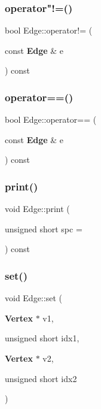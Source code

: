 \mbox{\label{classEdge_aad68f2cc1043548996c7ce6f4989a93d}} 
\subsubsection{operator"!=()}
{\footnotesize\ttfamily bool Edge\+::operator!= (\begin{DoxyParamCaption}\item[{const \textbf{ Edge} \&}]{e }\end{DoxyParamCaption}) const}

\mbox{\label{classEdge_a38c76499b14c3ada34f0b485f6e2a5bb}} 
\subsubsection{operator==()}
{\footnotesize\ttfamily bool Edge\+::operator== (\begin{DoxyParamCaption}\item[{const \textbf{ Edge} \&}]{e }\end{DoxyParamCaption}) const}

\mbox{\label{classEdge_a49933dc1fe12ca796ae077ea56d39cfb}} 
\subsubsection{print()}
{\footnotesize\ttfamily void Edge\+::print (\begin{DoxyParamCaption}\item[{unsigned short}]{spc = {} }\end{DoxyParamCaption}) const}

\mbox{\label{classEdge_ad0bc2e13a488d397b66d7bd674672a8e}} 
\subsubsection{set()}
{\footnotesize\ttfamily void Edge\+::set (\begin{DoxyParamCaption}\item[{\textbf{ Vertex} $\ast$}]{v1,  }\item[{unsigned short}]{idx1,  }\item[{\textbf{ Vertex} $\ast$}]{v2,  }\item[{unsigned short}]{idx2 }\end{DoxyParamCaption})}

